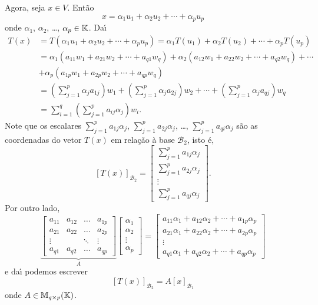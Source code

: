 Agora, seja $x \in V$. Ent\~ao
\[
	x = \alpha_1u_1 + \alpha_2u_2 + \cdots + \alpha_pu_p
\]
onde $\alpha_1$, $\alpha_2$, \dots, $\alpha_p \in \mathbb{K}$. Da{\'\i}
\begin{align*}
	T(x) &= T(\alpha_1u_1 + \alpha_2u_2 + \cdots + \alpha_pu_p) = \alpha_1T(u_1) + \alpha_2T(u_2) + \cdots + \alpha_pT(u_p)\\
	&= \alpha_1(a_{11}w_1 + a_{21}w_2 + \cdots + a_{q1}w_q) + \alpha_2(a_{12}w_1 + a_{22}w_2 + \cdots + a_{q2}w_q) + \cdots \\
	&+ \alpha_p(a_{1p}w_1 + a_{2p}w_2 + \cdots + a_{qp}w_q)\\
	&= (\sum_{j=1}^p\alpha_j a_{1j})w_1 + (\sum_{j=1}^p\alpha_j a_{2j})w_2 + \cdots + (\sum_{j=1}^p\alpha_j a_{qj})w_q\\
	&= \sum_{i=1}^q\left(\sum_{j=1}^p a_{ij}\alpha_j\right)w_i.
\end{align*}
Note que os escalares $\sum_{j=1}^p a_{1j}\alpha_j$, $\sum_{j=1}^p a_{2j}\alpha_j$, \dots, $\sum_{j=1}^p a_{qi}\alpha_j$ s\~ao as coordenadas do vetor $T(x)$ em rela\c{c}\~ao \`a base $\mathcal{B}_2$, isto \'e,
\[
	[T(x)]_{\mathcal{B}_2} = \begin{bmatrix}
		\sum_{j=1}^p a_{1j}\alpha_j\\
		\sum_{j=1}^p a_{2j}\alpha_j\\
		\vdots\\
		\sum_{j=1}^p a_{qj}\alpha_j
	\end{bmatrix}.
\]
Por outro lado,
\[
	\underbrace{\begin{bmatrix}
		a_{11} & a_{12} & \dots & a_{1p}\\
		a_{21} & a_{22} & \dots & a_{2p}\\
		\vdots & & \ddots & \vdots\\
		a_{q1} & a_{q2} & \dots & a_{qp}
	\end{bmatrix}}_{A}\begin{bmatrix}
		\alpha_1\\
		\alpha_2\\
		\vdots\\
		\alpha_p
	\end{bmatrix} = \begin{bmatrix}
		a_{11}\alpha_1 + a_{12}\alpha_2 + \cdots + a_{1p}\alpha_p\\
		a_{21}\alpha_1 + a_{22}\alpha_2 + \cdots + a_{2p}\alpha_p\\
		\vdots \\
		a_{q1}\alpha_1 + a_{q2}\alpha_2 + \cdots + a_{qp}\alpha_p
	\end{bmatrix}
\]
e da{\'\i} podemos escrever
\[
	[T(x)]_{\mathcal{B}_2} = A[x]_{\mathcal{B}_1}
\]
onde $A \in \mathbb{M}_{q\times p}(\mathbb{K})$.

